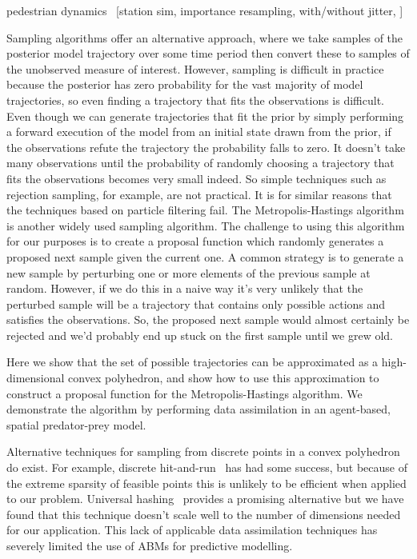 \documentclass{article}
\begin{document}
pedestrian dynamics~\cite{malleson_simulating_2020} [station sim, importance resampling, with/without jitter, ]

Sampling algorithms offer an alternative approach, where we take samples of the posterior model trajectory over some time period then convert these to samples of the unobserved measure of interest. However, sampling is difficult in practice because the posterior has zero probability for the vast majority of model trajectories, so even finding a trajectory that fits the observations is difficult. Even though we can generate trajectories that fit the prior by simply performing a forward execution of the model from an initial state drawn from the prior, if the observations refute the trajectory the probability falls to zero. It doesn't take many observations until the probability of randomly choosing a trajectory that fits the observations becomes very small indeed. So simple techniques such as rejection sampling, for example, are not practical.  It is for similar reasons that the techniques based on particle filtering fail. The Metropolis-Hastings algorithm is another widely used sampling algorithm. The challenge to using this algorithm for our purposes is to create a proposal function which randomly generates a proposed next sample given the current one. A common strategy is to generate a new sample by perturbing one or more elements of the previous sample at random. However, if we do this in a naive way it's very unlikely that the perturbed sample will be a trajectory that contains only possible actions and satisfies the observations. So, the proposed next sample would almost certainly be rejected and we'd probably end up stuck on the first sample until we grew old. 

Here we show that the set of possible trajectories can be approximated as a high-dimensional convex polyhedron, and show how to use this approximation to construct a proposal function for the Metropolis-Hastings algorithm. We demonstrate the algorithm by performing data assimilation in an agent-based, spatial predator-prey model.

Alternative techniques for sampling from discrete points in a convex polyhedron do exist. For example, discrete hit-and-run~\cite{baumert2009discrete} has had some success, but because of the extreme sparsity of feasible points this is unlikely to be efficient when applied to our problem. Universal hashing~\cite{meel2016constrained} provides a promising alternative but we have found that this technique doesn't scale well to the number of dimensions needed for our application. This lack of applicable data assimilation techniques has severely limited the use of ABMs for predictive modelling.
\end{document}

